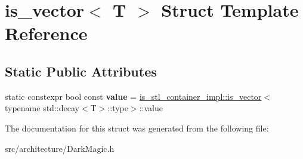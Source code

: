 \hypertarget{structis__vector}{}\section{is\+\_\+vector$<$ T $>$ Struct Template Reference}
\label{structis__vector}
\subsection*{Static Public Attributes}
\begin{DoxyCompactItemize}
\item 
\mbox{\label{structis__vector_a76eae47a02e865941c86505ddd1e0bb4}} 
static constexpr bool const {\bfseries value} = \hyperlink{structis__stl__container__impl_1_1is__vector}{is\+\_\+stl\+\_\+container\+\_\+impl\+::is\+\_\+vector}$<$typename std\+::decay$<$T$>$\+::type$>$\+::value
\end{DoxyCompactItemize}


The documentation for this struct was generated from the following file\+:\begin{DoxyCompactItemize}
\item 
src/architecture/Dark\+Magic.\+h\end{DoxyCompactItemize}
